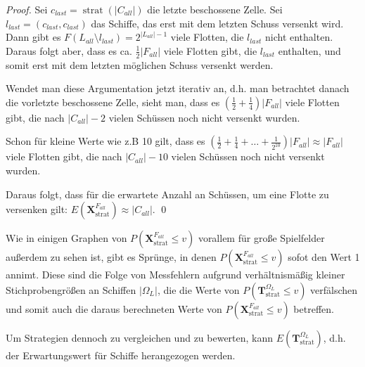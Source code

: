 \documentclass[a4paper,12pt]{llncs}
\numberwithin{equation}{section}
\DeclareMathOperator{\strat}{strat}
\begin{document}
\begin{proof}
Sei $c_{last}=\strat(|C_{all}|)$ die letzte beschossene Zelle.
Sei $l_{last}=(c_{last}, c_{last})$ das Schiffe, das erst mit dem letzten Schuss versenkt wird.
Dann gibt es $F(L_{all} \setminus l_{last})=2^{|L_{all}|-1}$ viele Flotten, die $l_{last}$ nicht enthalten.
Daraus folgt aber, dass es ca. $\frac{1}{2} |F_{all}|$ viele Flotten gibt, die $l_{last}$ enthalten, und somit erst mit dem letzten möglichen Schuss versenkt werden.

Wendet man diese Argumentation jetzt iterativ an, d.h. man betrachtet danach die vorletzte beschossene Zelle, sieht man, dass es $(\frac{1}{2} + \frac{1}{4}) |F_{all}|$ viele Flotten gibt, die nach $|C_{all}| - 2$ vielen Schüssen noch nicht versenkt wurden.

Schon für kleine Werte wie z.B 10 gilt, dass es $(\frac{1}{2} + \frac{1}{4} + \dots + \frac{1}{2^{10}}) |F_{all}| \approx |F_{all}|$ viele Flotten gibt, die nach $|C_{all}| - 10$ vielen Schüssen noch nicht versenkt wurden.

Daraus folgt, dass für die erwartete Anzahl an Schüssen, um eine Flotte zu versenken gilt: $E(\mathbf{X}^{F_{all}}_{\strat}) \approx |C_{all}|$.
\qed
\end{proof}

Wie in einigen Graphen von $P(\mathbf{X}^{F_{all}}_{\strat} \leq v)$ vorallem für große Spielfelder außerdem zu sehen ist, gibt es Sprünge, in denen $P(\mathbf{X}^{F_{all}}_{\strat} \leq v)$ sofot den Wert 1 annimt. Diese sind die Folge von Messfehlern aufgrund verhältnismäßig kleiner Stichprobengrößen an Schiffen $|\Omega_L|$, die die Werte von $P(\mathbf{T}^{\Omega_L}_{\strat} \leq v)$ verfälschen und somit auch die daraus berechneten Werte von $P(\mathbf{X}^{F_{all}}_{\strat} \leq v)$ betreffen.

Um Strategien dennoch zu vergleichen und zu bewerten, kann $E(\mathbf{T}^{\Omega_L}_{\strat})$, d.h. der Erwartungswert für Schiffe herangezogen werden.



\newpage

% 
\end{document}
